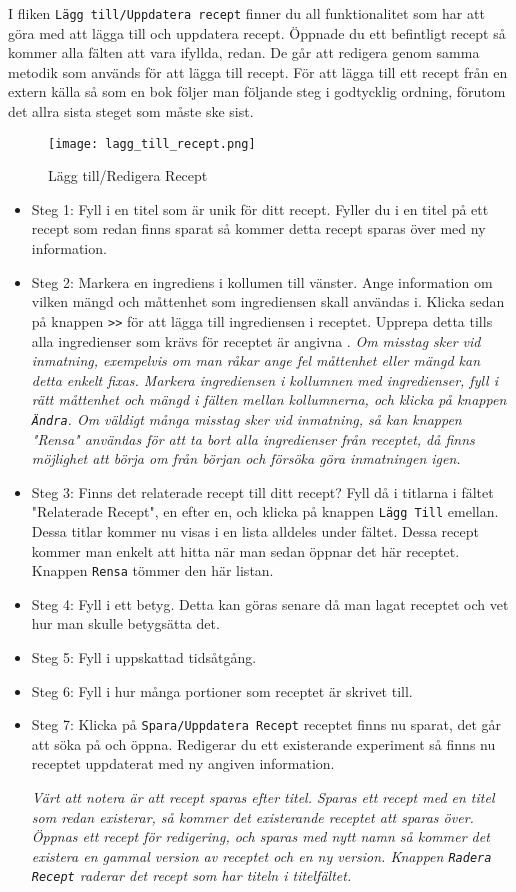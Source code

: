 I fliken \verb+Lägg till/Uppdatera recept+ finner du all funktionalitet som har att göra med att lägga till och uppdatera recept. Öppnade du ett befintligt recept så kommer alla fälten att vara ifyllda, redan. De går att redigera genom samma metodik som används för att lägga till recept. För att lägga till ett recept från en extern källa så som en bok följer man följande steg i godtycklig ordning, förutom det allra sista steget som måste ske sist. 

\begin{figure}[H]
        \centering 
        \texttt{[image: lagg\_till\_recept.png]} 
        \caption{Lägg till/Redigera Recept} 
        \label{fig:laggtillreceptvyn}
\end{figure}

\begin{itemize}
\item Steg 1: Fyll i en titel som är unik för ditt recept. Fyller du i en titel på ett recept som redan finns sparat så kommer detta recept sparas över med ny information.
\item Steg 2: Markera en ingrediens i kollumen till vänster. Ange information om vilken mängd och måttenhet som ingrediensen skall användas i. Klicka sedan på knappen \verb+>>+ för att lägga till ingrediensen i receptet. Upprepa detta tills alla ingredienser som krävs för receptet är angivna .
\em Om misstag sker vid inmatning, exempelvis om man råkar ange fel måttenhet eller mängd kan detta enkelt fixas. Markera ingrediensen i kollumnen med ingredienser, fyll i rätt måttenhet och mängd i fälten mellan kollumnerna, och klicka på knappen \verb+Ändra+. 
Om väldigt många misstag sker vid inmatning, så kan knappen "Rensa" användas för att ta bort alla ingredienser från receptet, då finns möjlighet att börja om från början och försöka göra inmatningen igen. \em
\item Steg 3: Finns det relaterade recept till ditt recept? Fyll då i titlarna i fältet "Relaterade Recept", en efter en, och klicka på knappen \verb+Lägg Till+ emellan. Dessa titlar kommer nu visas i en lista alldeles under fältet. Dessa recept kommer man enkelt att hitta när man sedan öppnar det här receptet. Knappen \verb+Rensa+ tömmer den här listan. 
\item Steg 4: Fyll i ett betyg. Detta kan göras senare då man lagat receptet och vet hur man skulle betygsätta det. 
\item Steg 5: Fyll i uppskattad tidsåtgång.
\item Steg 6: Fyll i hur många portioner som receptet är skrivet till. 
\item Steg 7: Klicka på \verb+Spara/Uppdatera Recept+ receptet finns nu sparat, det går att söka på och öppna. Redigerar du ett existerande experiment så finns nu receptet uppdaterat med ny angiven information.

\em Värt att notera är att recept sparas efter titel. Sparas ett recept med en titel som redan existerar, så kommer det existerande receptet att sparas över. Öppnas ett recept för redigering, och sparas med nytt namn så kommer det existera en gammal version av receptet och en ny version. Knappen \verb+Radera Recept+ raderar det recept som har titeln i titelfältet.\em
\end{itemize}

